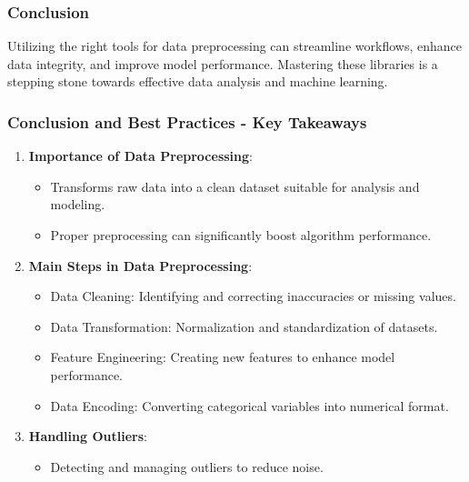 \documentclass{beamer}
\begin{document}
\begin{frame}
    \frametitle{Conclusion}
    Utilizing the right tools for data preprocessing can streamline workflows, enhance data integrity, and improve model performance. Mastering these libraries is a stepping stone towards effective data analysis and machine learning.
\end{frame}

\begin{frame}[fragile]
    \frametitle{Conclusion and Best Practices - Key Takeaways}
    \begin{enumerate}
        \item \textbf{Importance of Data Preprocessing}:
        \begin{itemize}
            \item Transforms raw data into a clean dataset suitable for analysis and modeling.
            \item Proper preprocessing can significantly boost algorithm performance.
        \end{itemize}
        
        \item \textbf{Main Steps in Data Preprocessing}:
        \begin{itemize}
            \item Data Cleaning: Identifying and correcting inaccuracies or missing values.
            \item Data Transformation: Normalization and standardization of datasets.
            \item Feature Engineering: Creating new features to enhance model performance.
            \item Data Encoding: Converting categorical variables into numerical format.
        \end{itemize}
        
        \item \textbf{Handling Outliers}:
        \begin{itemize}
            \item Detecting and managing outliers to reduce noise.
        \end{itemize}
    \end{enumerate}
\end{frame}
\end{document}

